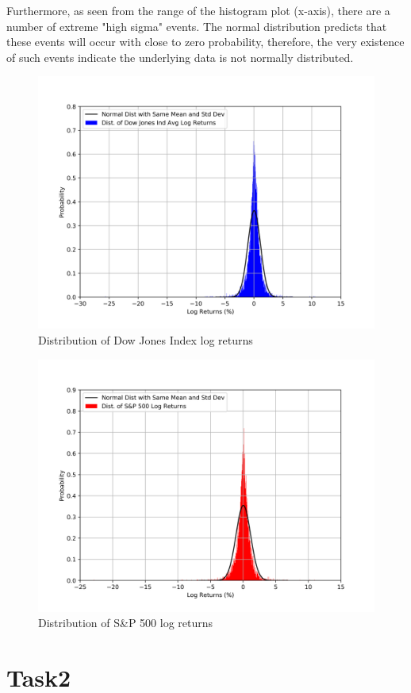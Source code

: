 \documentclass[a4paper]{article}
\begin{document}
	Furthermore, as seen from the range of the histogram plot (x-axis), there are a number of extreme "high sigma" events. The normal distribution predicts that these events will occur with close to zero probability, therefore, the very existence of such events indicate the underlying data is not normally distributed. 
	\newpage	
	\begin{figure}[h!]
		\centering
		\includegraphics[width=0.8\linewidth]{DJInorm.png}
		\caption{Distribution of Dow Jones Index log returns}
	\end{figure}
	\begin{figure}[h!]
		\centering
		\includegraphics[width=0.8\linewidth]{GSPCnorm.png}
		\caption{Distribution of S\&P 500 log returns}
	\end{figure}
	
	\newpage
	\section{Task2}
	\label{sec:introduction}
	
\end{document}
